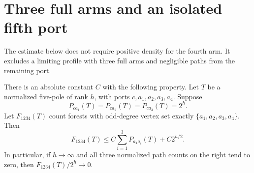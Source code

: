 \section{Three full arms and an isolated fifth port}
\label{sec:three-arm-isolated-port}

The estimate below does not require positive density for the fourth arm.
It excludes a limiting profile with three full arms and negligible paths from the remaining port.

\begin{theorem}
\label{thm:three-full-arms-forest-control}
There is an absolute constant $C$ with the following property.
Let $T$ be a normalized five-pole of rank $h$, with ports $c,a_1,a_2,a_3,a_4$.
Suppose
\[
 P_{ca_1}(T)=P_{ca_2}(T)=P_{ca_3}(T)=2^h.
\]
Let $F_{1234}(T)$ count forests with odd-degree vertex set exactly
$\{a_1,a_2,a_3,a_4\}$.
Then
\begin{equation}\label{eq:three-arm-forest-control}
 F_{1234}(T)
 \le C\sum_{i=1}^3P_{a_4a_i}(T)+C2^{h/2}.
\end{equation}
In particular, if $h\to\infty$ and all three normalized path counts on the right tend to zero, then $F_{1234}(T)/2^h\to0$.
\end{theorem}

